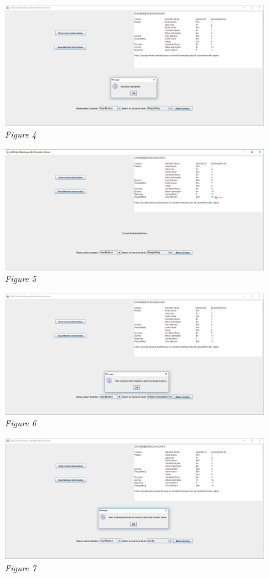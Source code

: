 \documentclass[12pt, oneside]{article}
\begin{document}
\begin{figure}[ht!]
\centering
\includegraphics[width=17cm]{fig5}
\caption*{ \textit{Figure 4} }
\end{figure}
\begin{figure}[ht!]
\centering
\includegraphics[width=17cm]{fig6}
\caption*{ \textit{Figure 5} }
\end{figure}
\begin{figure}[ht!]
\centering
\includegraphics[width=17cm]{fig8}
\caption*{ \textit{Figure 6} }
\end{figure}
\begin{figure}[ht!]
\centering
\includegraphics[width=17cm]{fig10}
\caption*{ \textit{Figure 7} }
\end{figure}
\end{document}
